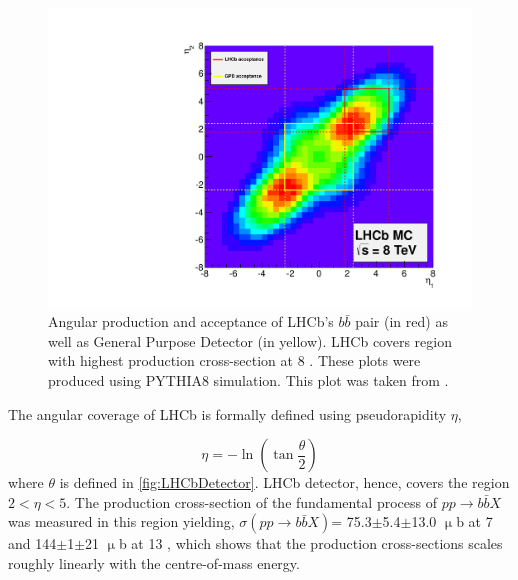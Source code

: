 \begin{figure}
	\centering
	\includegraphics[scale = 0.3]{figs/detector/Acceptance.pdf}
	\caption{Angular production and acceptance of LHCb's $b\bar{b}$ pair (in red) as well as General Purpose Detector (in yellow). \Gls{LHCb} covers region with highest production cross-section at 8 \tev. These plots were produced using PYTHIA8 \cite{pythia8} simulation. This plot was taken from \cite{acceptance}.}
	\label{fig:Acceptance}
\end{figure}

The angular coverage of \Gls{LHCb} is formally defined using pseudorapidity $\eta$, 

\begin{equation}
	\eta = -\ln (\tan\frac{\theta}{2})
\end{equation}	
where $\theta$ is defined in \autoref{fig:LHCbDetector}. \Gls{LHCb} detector, hence, covers the region $2<\eta<5$. The production cross-section of the fundamental process of $pp\rightarrow b\bar{b}X$ was measured in this region yielding, $\sigma (pp\rightarrow b\bar{b}X)$= 75.3$\pm$5.4$\pm$13.0 $\upmu$b at 7 \tev \cite{LHCb-PAPER-2010-002} and 144$\pm$1$\pm$21 $\upmu$b at 13 \tev \cite{LHCb-PAPER-2016-031}, which shows that the production cross-sections scales roughly linearly with the centre-of-mass energy.

